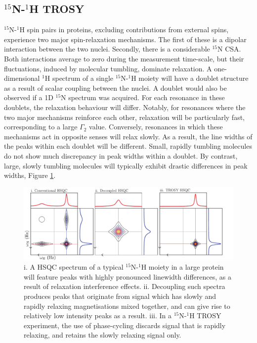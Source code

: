 \subsection{$^{15}$N-$^1$H TROSY}
$^{15}$N-$^{1}$H spin pairs in proteins, excluding contributions from external spins, experience two major spin-relaxation mechanisms. The first of these is a dipolar interaction between the two nuclei. Secondly, there is a considerable $^{15}$N CSA. Both interactions average to zero during the measurement time-scale, but their fluctuations, induced by molecular tumbling, dominate relaxation. A one-dimensional $^1$H spectrum of a single $^{15}$N-$^{1}$H moiety will have a doublet structure as a result of scalar coupling between the nuclei. A doublet would also be observed if a 1D $^{15}$N spectrum was acquired. For each resonance in these doublets, the relaxation behaviour will differ. Notably, for resonances where the two major mechanisms reinforce each other, relaxation will be particularly fast, corresponding to a large $\Gamma_2$ value. Conversely, resonances in which these mechanisms act in opposite senses will relax slowly. As a result, the line widths of the peaks within each doublet will be different. Small, rapidly tumbling molecules do not show much discrepancy in peak widths within a doublet. By contrast, large, slowly tumbling molecules will typically exhibit drastic differences in peak widths, Figure \ref{NHTrosy}.\\
\begin{figure}
\centering
\includegraphics[scale=0.7]{./Figures/SimonsFigs/NHTrosy.pdf}
\caption{i. A HSQC spectrum of a typical $^{15}$N-$^1$H moiety in a large protein will feature peaks with highly pronounced linewidth differences, as a result of relaxation interference effects. ii. Decoupling such spectra produces peaks that originate from signal which has slowly and rapidly relaxing magnetisations mixed together, and can give rise to relatively low intensity peaks as a result. iii. In a $^{15}$N-$^1$H TROSY experiment, the use of phase-cycling discards signal that is rapidly relaxing, and retains the slowly relaxing signal only.}
\label{NHTrosy}
\end{figure}
